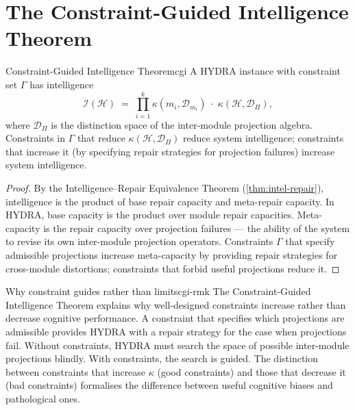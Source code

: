 \documentclass[12pt,twoside,openright]{book}
\begin{document}
\section{The Constraint-Guided Intelligence Theorem}

\begin{theorem}{Constraint-Guided Intelligence Theorem}{cgi}
  A HYDRA instance with constraint set $\Gamma$ has
  intelligence
  \[
    \mathcal{I}(\mathcal{H})
    \;=\;
    \prod_{i=1}^k
    \kappa(m_i, \mathcal{D}_{m_i})
    \;\cdot\;
    \kappa(\mathcal{H}, \mathcal{D}_\Pi),
  \]
  where $\mathcal{D}_\Pi$ is the distinction space of
  the inter-module projection algebra.
  Constraints in $\Gamma$ that reduce
  $\kappa(\mathcal{H}, \mathcal{D}_\Pi)$ reduce
  system intelligence; constraints that increase it
  (by specifying repair strategies for projection failures)
  increase system intelligence.
\end{theorem}

\begin{proof}
  By the Intelligence--Repair Equivalence Theorem
  (\cref{thm:intel-repair}), intelligence is the product
  of base repair capacity and meta-repair capacity.
  In HYDRA, base capacity is the product over module
  repair capacities. Meta-capacity is the repair capacity
  over projection failures — the ability of the system
  to revise its own inter-module projection operators.
  Constraints $\Gamma$ that specify admissible projections
  increase meta-capacity by providing repair strategies
  for cross-module distortions; constraints that forbid
  useful projections reduce it.
\end{proof}

\begin{remark}{Why constraint guides rather than limits}{cgi-rmk}
  The Constraint-Guided Intelligence Theorem explains
  why well-designed constraints increase rather than
  decrease cognitive performance. A constraint that
  specifies which projections are admissible provides
  HYDRA with a repair strategy for the case when
  projections fail. Without constraints, HYDRA must
  search the space of possible inter-module projections
  blindly. With constraints, the search is guided.
  The distinction between constraints that increase
  $\kappa$ (good constraints) and those that decrease
  it (bad constraints) formalises the difference between
  useful cognitive biases and pathological ones.
\end{remark}
\end{document}
